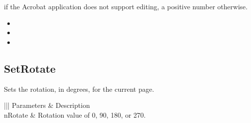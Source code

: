 \documentclass[letterpaper,12pt,english,openany,oneside]{sphinxmanual}
\begin{document}

 if the Acrobat application does not support editing, a positive number otherwise.

\label{\detokenize{IAC_API_OLE_Objects:related-methods-127}}
\begin{itemize}
\item {} 
 

\item {} 
 

\item {} 
 

\end{itemize}




\subsection{SetRotate}
\label{\detokenize{IAC_API_OLE_Objects:setrotate}}
Sets the rotation, in degrees, for the current page.


\begin{sphinxVerbatim}[commandchars=\\\{\}]
  
\end{sphinxVerbatim}
\label{\detokenize{IAC_API_OLE_Objects:parameters-78}}


\begin{savenotes}\sphinxattablestart
\centering
{}\label{\detokenize{IAC_API_OLE_Objects:section-87}}\nobreak
\begin{tabular}[t]{|||}
\hline
\sphinxstyletheadfamily 
Parameters
&\sphinxstyletheadfamily 
Description
\\
\hline
nRotate
&
Rotation value of 0, 90, 180, or 270.
\\
\hline
\end{tabular}
\par
\sphinxattableend\end{savenotes}
\end{document}
